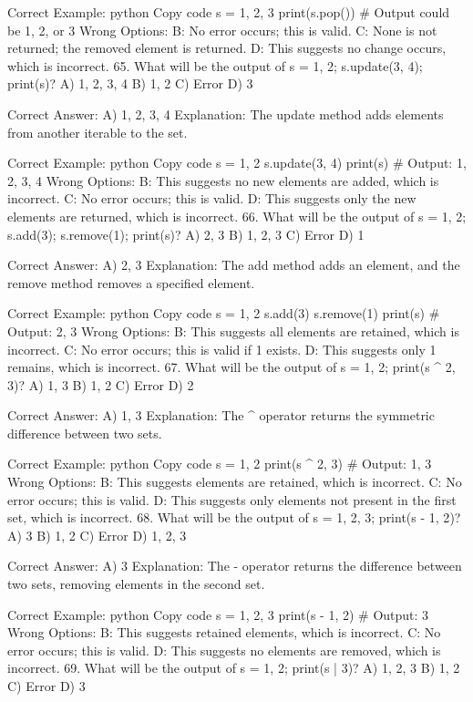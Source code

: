 Correct Example:
python
Copy code
s = {1, 2, 3}
print(s.pop())  # Output could be 1, 2, or 3
Wrong Options:
B: No error occurs; this is valid.
C: None is not returned; the removed element is returned.
D: This suggests no change occurs, which is incorrect.
65. What will be the output of s = {1, 2}; s.update({3, 4}); print(s)?
A) {1, 2, 3, 4}
B) {1, 2}
C) Error
D) {3}

Correct Answer: A) {1, 2, 3, 4}
Explanation: The update method adds elements from another iterable to the set.

Correct Example:
python
Copy code
s = {1, 2}
s.update({3, 4})
print(s)  # Output: {1, 2, 3, 4}
Wrong Options:
B: This suggests no new elements are added, which is incorrect.
C: No error occurs; this is valid.
D: This suggests only the new elements are returned, which is incorrect.
66. What will be the output of s = {1, 2}; s.add(3); s.remove(1); print(s)?
A) {2, 3}
B) {1, 2, 3}
C) Error
D) {1}

Correct Answer: A) {2, 3}
Explanation: The add method adds an element, and the remove method removes a specified element.

Correct Example:
python
Copy code
s = {1, 2}
s.add(3)
s.remove(1)
print(s)  # Output: {2, 3}
Wrong Options:
B: This suggests all elements are retained, which is incorrect.
C: No error occurs; this is valid if 1 exists.
D: This suggests only 1 remains, which is incorrect.
67. What will be the output of s = {1, 2}; print(s ^ {2, 3})?
A) {1, 3}
B) {1, 2}
C) Error
D) {2}

Correct Answer: A) {1, 3}
Explanation: The ^ operator returns the symmetric difference between two sets.

Correct Example:
python
Copy code
s = {1, 2}
print(s ^ {2, 3})  # Output: {1, 3}
Wrong Options:
B: This suggests elements are retained, which is incorrect.
C: No error occurs; this is valid.
D: This suggests only elements not present in the first set, which is incorrect.
68. What will be the output of s = {1, 2, 3}; print(s - {1, 2})?
A) {3}
B) {1, 2}
C) Error
D) {1, 2, 3}

Correct Answer: A) {3}
Explanation: The - operator returns the difference between two sets, removing elements in the second set.

Correct Example:
python
Copy code
s = {1, 2, 3}
print(s - {1, 2})  # Output: {3}
Wrong Options:
B: This suggests retained elements, which is incorrect.
C: No error occurs; this is valid.
D: This suggests no elements are removed, which is incorrect.
69. What will be the output of s = {1, 2}; print(s | {3})?
A) {1, 2, 3}
B) {1, 2}
C) Error
D) {3}

